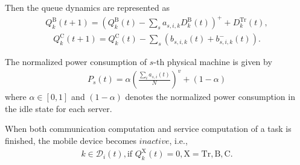 Then the queue dynamics are represented as
\begin{align}
    Q_{k}^{\mathrm{B}}(t+1)=(Q_{k}^{\mathrm{B}}(t)-\sum_{s}a_{s,i,k}D_{k}^{\mathrm{B}}(t))^{+}+D_{k}^{\mathrm{Tr}}(t),
\end{align}
\begin{align}
    Q_{k}^{\mathrm{C}}(t+1)=Q_{k}^{\mathrm{C}}(t)-\sum_{s}(b_{s,i,k}(t)+b_{s,i,k}^{-}(t)).
\end{align}

The normalized power consumption of $s$-th physical machine is given by
\begin{align}
    P_{s}(t)= \alpha\left(\frac{\sum_{i}a_{s,i}(t)}{N}\right)^{v}+(1-\alpha)
\end{align}
where $\alpha\in[0,1]$ and $(1-\alpha)$ denotes the normalized power consumption in the idle state for each server.

When both communication computation and service computation of a task is finished, the mobile device becomes $\textit{inactive}$, i.e.,
\begin{align}
    k\in\mathcal{D}_{i}(t),\text{if }Q_{k}^{\mathrm{X}}(t)=0,\mathrm{X}=\mathrm{Tr},\mathrm{B},\mathrm{C}.
\end{align}
